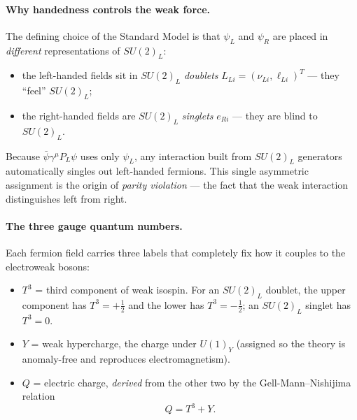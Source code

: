 \paragraph{Why handedness controls the weak force.}
The defining choice of the Standard Model is that $\psi_L$ and $\psi_R$
are placed in \emph{different} representations of $SU(2)_L$:
\begin{itemize}
  \item the left-handed fields sit in $SU(2)_L$ \emph{doublets}
        $L_{Li}=(\nu_{Li},\ell_{Li})^T$ --- they ``feel'' $SU(2)_L$;
  \item the right-handed fields are $SU(2)_L$ \emph{singlets} $e_{Ri}$
        --- they are blind to $SU(2)_L$.
\end{itemize}
Because $\bar\psi\gamma^\mu P_L\psi$ uses only $\psi_L$, any interaction
built from $SU(2)_L$ generators automatically singles out left-handed
fermions. This single asymmetric assignment is the origin of
\emph{parity violation} --- the fact that the weak interaction
distinguishes left from right.


\paragraph{The three gauge quantum numbers.}
Each fermion field carries three labels that completely fix how it
couples to the electroweak bosons:
\begin{itemize}
  \item $T^3$ = third component of weak isospin. For an $SU(2)_L$
        doublet, the upper component has $T^3=+\tfrac12$ and the lower
        has $T^3=-\tfrac12$; an $SU(2)_L$ singlet has $T^3=0$.
  \item $Y$ = weak hypercharge, the charge under $U(1)_Y$ (assigned so
        the theory is anomaly-free and reproduces electromagnetism).
  \item $Q$ = electric charge, \emph{derived} from the other two by the
        Gell-Mann--Nishijima relation
        \begin{equation}
          \boxed{Q = T^3 + Y.}
          \label{eq:lec19:gell-mann-nishijima}
        \end{equation}
\end{itemize}


